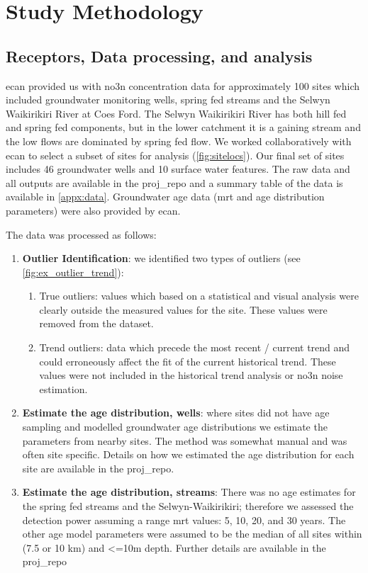 \section[Methods]{Study Methodology}   \label{sec:methods}
\subsection[Data Processing]{Receptors, Data processing, and analysis} \label{sec:data}

\gls{ecan} provided us with \gls{no3n} concentration data for approximately 100 sites which included groundwater monitoring wells, spring fed streams and the Selwyn Waikirikiri River at Coes Ford.
The Selwyn Waikirikiri River has both hill fed and spring fed components, but in the lower catchment it is a gaining stream and the low flows are dominated by spring fed flow.
We worked collaboratively with \gls{ecan} to select a subset of sites for analysis (\autoref{fig:sitelocs}).
Our final set of sites includes 46 groundwater wells and 10 surface water features.
The raw data and all outputs are available in the \gls{proj_repo} and a summary table of the data is available in \autoref{appx:data}.
Groundwater age data (\gls{mrt} and age distribution parameters) were also provided by \gls{ecan}.

The data was processed as follows:
\begin{enumerate}
    \item \textbf{Outlier Identification}: we identified two types of outliers (see \autoref{fig:ex_outlier_trend}):
    \begin{enumerate}
        \item  True outliers: values which based on a statistical and visual analysis were clearly outside the measured values for the site. These values were removed from the dataset.
        \item Trend outliers: data which precede the most recent / current trend and could erroneously affect the fit of the current historical trend. These values were not included in the historical trend analysis or \gls{no3n} noise estimation.
    \end{enumerate}
    \item \textbf{Estimate the age distribution, wells}: where sites did not have age sampling and modelled groundwater age distributions we estimate the parameters from nearby sites. The method was somewhat manual and was often site specific. Details on how we estimated the age distribution for each site are available in the \gls{proj_repo}.
    \item \textbf{Estimate the age distribution, streams}: There was no age estimates for the spring fed streams and the Selwyn-Waikirikiri; therefore we assessed the detection power assuming a range \gls{mrt} values: 5, 10, 20, and 30 years. The other age model parameters were assumed to be the median of all sites within (7.5 or 10 km) and <=10m depth. Further details are available in the \gls{proj_repo}
\end{enumerate}

